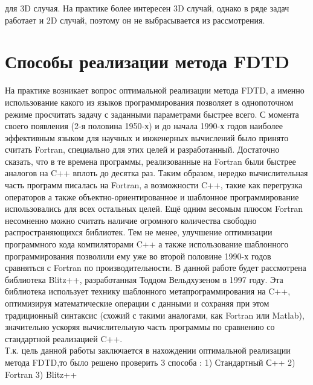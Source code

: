 \documentclass[10pt]{article}
\begin{document}
для 3D случая. На практике более интересен 3D случай, однако в ряде задач
работает и 2D случай, поэтому он не выбрасывается из рассмотрения.
\section{Способы реализации метода FDTD}
\label{fdtd_coding}
На практике возникает вопрос оптимальной реализации метода FDTD, а именно
использование какого из языков программирования позволяет в однопоточном
режиме просчитать задачу с заданными параметрами быстрее всего. С момента 
своего появления (2-я половина 1950-х) и до начала 1990-х годов наиболее 
эффективным языком для научных и инженерных вычислений было принято считать 
Fortran, специально для этих целей и разработанный. Достаточно сказать, что в 
те времена программы, реализованные на Fortran были быстрее аналогов на C++ 
вплоть до десятка раз\cite{Todd1997}. Таким образом, нередко вычислительная 
часть программ писалась на Fortran, а возможности C++, такие как перегрузка 
операторов а также объектно-ориентированное и шаблонное программирование 
использовались для всех остальных целей. Ещё одним весомым плюсом Fortran 
несомненно можно считать наличие огромного количества свободно распространяющихся
библиотек. Тем не менее, улучшение оптимизации программного кода компиляторами 
C++ а также использование шаблонного программирования позволили ему уже во второй
половине 1990-х годов сравняться с Fortran по производительности. В данной работе
будет рассмотрена библиотека Blitz++\cite{blitz_web}, разработанная Тоддом
Вельдхузеном в 1997 году. Эта библиотека использует технику шаблонного
метапрограммирования на C++, оптимизируя математические операции с данными и
сохраняя при этом традиционный синтаксис (схожий с такими аналогами, как 
Fortran или Matlab), значительно ускоряя вычислительную часть программы по 
сравнению со стандартной реализацией C++.\\
Т.к. цель данной работы заключается в нахождении оптимальной реализации
метода FDTD,то было решено проверить 3 способа : 1) Стандартный С++ 2) Fortran 
3) Blitz++
\end{document}
